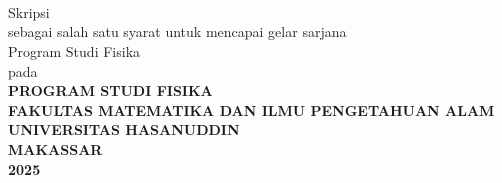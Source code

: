 \begingroup
\singlespacing
\fontsize{11pt}{13pt}\selectfont
\begin{center}
  \textbf{\JudulSkripsi} \\
  \vfill
  \NamaPenulis \\
  \NIM \\
  \vfill
  \begingroup
  \fontsize{10pt}{13pt}\selectfont
  Skripsi \\
  \vspace*{1cm}
  sebagai salah satu syarat untuk mencapai gelar sarjana \\
  \endgroup
  \vspace*{1cm}
  Program Studi Fisika \\
  \vfill
  pada \\
  \vfill
  \textbf{PROGRAM STUDI FISIKA} \\
  \textbf{FAKULTAS MATEMATIKA DAN ILMU PENGETAHUAN ALAM} \\
  \textbf{UNIVERSITAS HASANUDDIN} \\
  \textbf{MAKASSAR} \\
  \textbf{2025}
\end{center}
\endgroup
\restoregeometry
